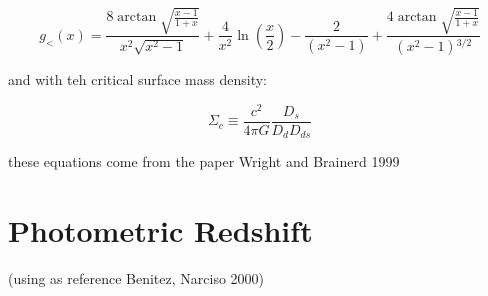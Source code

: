\begin{equation}
g_{<}(x)=\frac{8 \arctan \sqrt{\frac{x-1}{1+x}}}{x^{2}\sqrt{x^{2}-1}}+\frac{4}{x^{2}}\ln \left(\frac{x}{2}\right)-\frac{2}{\left(x^{2}-1\right)}+\frac{4 \arctan \sqrt{\frac{x-1}{1+x}}}{\left(x^{2}-1\right){}^{3/2}}
\end{equation} 

and with teh critical surface mass density:

\begin{equation}
\Sigma_{c}\equiv\frac{c^{2}}{4\pi G}\frac{D_{s}}{D_{d}D_{ds}}
\end{equation}

these equations come from the paper Wright and Brainerd 1999

\section{Photometric Redshift}

(using as reference Benitez, Narciso 2000)
 
 